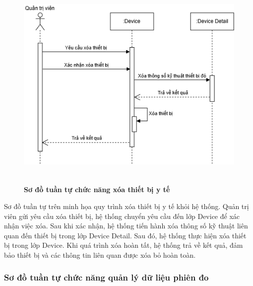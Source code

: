\begin{figure}[H]
	\centering
	\includegraphics[width=12cm,height=10.5cm]{Images/sequence/device/delete.drawio.png}
	\caption[Sơ đồ tuần tự chức năng xóa thiết bị y tế]{\bfseries \fontsize{12pt}{0pt}
		\selectfont Sơ đồ tuần tự chức năng xóa thiết bị y tế}
	\label{sequence_delete_device} %
\end{figure}
Sơ đồ tuần tự trên minh họa quy trình xóa thiết bị y tế khỏi hệ thống. Quản trị viên gửi yêu cầu xóa thiết bị, hệ thống chuyển yêu cầu đến lớp Device để xác nhận việc xóa.
Sau khi xác nhận, hệ thống tiến hành xóa thông số kỹ thuật liên quan đến thiết bị trong lớp Device Detail. Sau đó, hệ thống thực hiện xóa thiết bị trong lớp Device.
Khi quá trình xóa hoàn tất, hệ thống trả về kết quả, đảm bảo thiết bị và các thông tin liên quan được xóa bỏ hoàn toàn.

\subsubsection{Sơ đồ tuần tự chức năng quản lý dữ liệu phiên đo}

